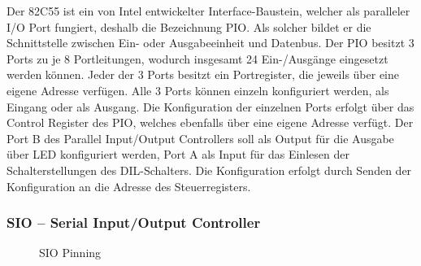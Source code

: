 Der 82C55 ist ein von Intel entwickelter Interface-Baustein, welcher als paralleler I/O Port fungiert, deshalb die Bezeichnung PIO. Als solcher bildet er die Schnittstelle zwischen Ein- oder Ausgabeeinheit und Datenbus. Der PIO besitzt 3 Ports zu je 8 Portleitungen, wodurch insgesamt 24 Ein-/Ausgänge eingesetzt werden können. Jeder der 3 Ports besitzt ein Portregister, die jeweils über eine eigene Adresse verfügen. 
Alle 3 Ports können einzeln konfiguriert werden, als Eingang oder als Ausgang. Die Konfiguration der einzelnen Ports erfolgt über das Control Register des PIO, welches ebenfalls über eine eigene Adresse verfügt.
Der Port B des Parallel Input/Output Controllers soll als Output für die Ausgabe über LED konfiguriert werden, Port A als Input für das Einlesen der Schalterstellungen des DIL-Schalters. Die Konfiguration erfolgt durch Senden der Konfiguration an die Adresse des Steuerregisters.

\subsubsection{SIO -- Serial Input/Output Controller}
\begin{figure}[H]
    \qquad
    \qquad
    \caption[Z80 SIO Pinning]{SIO Pinning \cite{z80:sio}}
    \label{fig:z80-sio-pinning}
\end{figure}


